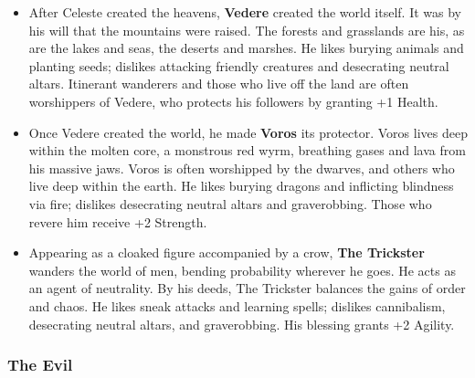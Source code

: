 \begin{itemize}
\item After Celeste created the heavens, {\bf Vedere} created the world 
itself.  It was by his will that the mountains were raised.  The forests 
and grasslands are his, as are the lakes and seas, the deserts and 
marshes.  He likes burying animals and planting seeds; dislikes attacking 
friendly creatures and desecrating neutral altars.  Itinerant wanderers and 
those who live off the land are often worshippers of Vedere, who protects his 
followers by granting +1 Health.

\item Once Vedere created the world, he made {\bf Voros} its protector.  
Voros lives deep within the molten core, a monstrous red wyrm, breathing 
gases and lava from his massive jaws.  Voros is often worshipped by the 
dwarves, and others who live deep within the earth.  He likes burying dragons 
and inflicting blindness via fire; dislikes desecrating neutral altars and
graverobbing.  Those who revere him receive +2 Strength.

\item Appearing as a cloaked figure accompanied by a crow, 
{\bf The Trickster} wanders the world of men, bending probability wherever 
he goes.  He acts as an agent of neutrality.  By his deeds, The Trickster 
balances the gains of order and chaos.  He likes sneak attacks and learning
spells; dislikes cannibalism, desecrating neutral altars, and graverobbing.  
His blessing grants +2 Agility.
\end{itemize}

\subsubsection{The Evil}


